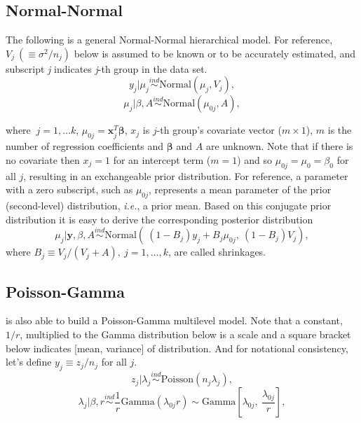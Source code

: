 \documentclass[article]{jss}
\begin{document}
 
\subsection[Normal-Normal]{Normal-Normal}
The following is a general Normal-Normal hierarchical model. For reference,  $V_{j}~(\equiv \sigma^{2}/n_{j})$ below is assumed to be known or to be accurately estimated, and subscript \emph{j} indicates \emph{j}-th group in the data set.
\begin{equation}
y_{j}\vert \mu_{j} \stackrel{ind}{\sim}\textrm{Normal}(\mu_{j}, V_{j}),
\end{equation}
\begin{equation}
\mu_{j}\vert \beta, A\stackrel{ind}{\sim}\textrm{Normal}(\mu_{0j}, A),
\end{equation}

where $~j=1, \ldots k$, $\mu_{0j} = \mathbf{x}^{T}_{j} \mathbf{\beta}$, $x_{j}$ is $j$-th group's covariate vector ($m\times 1$), $m$ is the number of regression coefficients and $\mathbf{\beta}$ and $A$ are unknown. Note that if there is no covariate then $x_{j}=1$ for an intercept term ($m=1$) and so $\mu_{0j}=\mu_{0}=\beta_{0}$ for all $j$, resulting in an exchangeable prior distribution. For reference, a parameter with a zero subscript, such as $\mu_{0j}$, represents a mean parameter of the prior (second-level) distribution, \emph{i.e.}, a prior mean. Based on this conjugate prior distribution it is easy to derive the corresponding posterior distribution
\begin{equation} \label{normalpost}
\mu_{j}\vert \textbf{y}, \beta, A \stackrel{ind}{\sim}\textrm{Normal}(~(1-B_{j})y_{j} + B_{j}\mu_{0j},~(1-B_{j})V_{j}),
\end{equation}
where $B_{j}\equiv V_{j}/(V_{j} + A),~j=1, \ldots, k$, are called shrinkages.

\subsection[Poisson-Gamma]{Poisson-Gamma}
 is also able to build a Poisson-Gamma multilevel model. Note that a constant, $1/r$, multiplied to the Gamma distribution below is a scale and a square bracket below indicates [mean, variance] of distribution. And for notational consistency, let's define $y_{j}\equiv z_{j} / n_{j}$ for all $j$.
\begin{equation}
z_{j}\vert \lambda_{j} \stackrel{ind}{\sim}\textrm{Poisson}(n_{j}\lambda_{j}),
\end{equation}
\begin{equation}
\lambda_{j}\vert \beta, r\stackrel{ind}{\sim}\frac{1}{r}\textrm{Gamma}(\lambda_{0j}r)\sim \textrm{Gamma} \left[\lambda_{0j}, ~\frac{\lambda_{0j}}{r} \right],
\end{equation}
\end{document}
